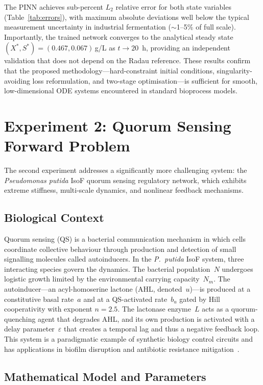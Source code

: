 \documentclass[14pt,a4paper,openany]{extbook}
\begin{document}
The PINN achieves sub-percent $L_2$ relative error for both state variables (Table~\ref{tab:errors}), with maximum absolute deviations well below the typical measurement uncertainty in industrial fermentation ($\sim$1--5\% of full scale). Importantly, the trained network converges to the analytical steady state $(X^*, S^*) = (0.467, 0.067)$\,g/L as $t \to 20$~h, providing an independent validation that does not depend on the Radau reference. These results confirm that the proposed methodology---hard-constraint initial conditions, singularity-avoiding loss reformulation, and two-stage optimisation---is sufficient for smooth, low-dimensional ODE systems encountered in standard bioprocess models.

\section{Experiment 2: Quorum Sensing Forward Problem}
\label{sec:qs_experiment_forward}

The second experiment addresses a significantly more challenging system: the \textit{Pseudomonas putida} IsoF quorum sensing regulatory network, which exhibits extreme stiffness, multi-scale dynamics, and nonlinear feedback mechanisms.

\subsection{Biological Context}
\label{subsec:qs_biology}

Quorum sensing (QS) is a bacterial communication mechanism in which cells coordinate
collective behaviour through production and detection of small signalling molecules
called autoinducers.  In the \textit{P.~putida} IsoF system, three interacting species
govern the dynamics.  The bacterial population~$N$ undergoes logistic growth limited by
the environmental carrying capacity~$N_m$.  The autoinducer---an acyl-homoserine
lactone (AHL, denoted~$u$)---is produced at a constitutive basal rate~$a$ and at a
QS-activated rate~$b_u$ gated by Hill cooperativity with exponent $n = 2.5$.  The
lactonase enzyme~$L$ acts as a quorum-quenching agent that degrades AHL, and its own
production is activated with a delay parameter~$\varepsilon$ that creates a temporal lag
and thus a negative feedback loop.  This system is a paradigmatic example of synthetic
biology control circuits and has applications in biofilm disruption and antibiotic
resistance mitigation~\cite{grandclement2016quorum}.

\subsection{Mathematical Model and Parameters}
\label{subsec:qs_params_forward}
\end{document}
